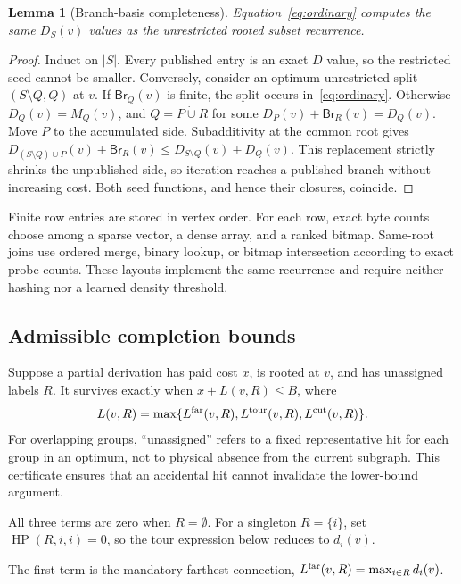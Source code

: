 \documentclass[sigconf,nonacm]{acmart}
\newtheorem{lemma}{Lemma}
\newcommand{\Br}{\mathsf{Br}}
\begin{document}
\begin{lemma}[Branch-basis completeness]
\label{lem:branch}
Equation~\eqref{eq:ordinary} computes the same $D_S(v)$ values as the unrestricted rooted subset recurrence.
\end{lemma}
\begin{proof}
Induct on $|S|$.  Every published entry is an exact $D$ value, so the restricted seed cannot be smaller.  Conversely, consider an optimum unrestricted split $(S\setminus Q,Q)$ at $v$.  If $\Br_Q(v)$ is finite, the split occurs in~\eqref{eq:ordinary}.  Otherwise $D_Q(v)=M_Q(v)$, and $Q=P\mathbin{\dot\cup}R$ for some $D_P(v)+\Br_R(v)=D_Q(v)$.  Move $P$ to the accumulated side.  Subadditivity at the common root gives
$D_{(S\setminus Q)\cup P}(v)+\Br_R(v)\leq D_{S\setminus Q}(v)+D_Q(v)$.
This replacement strictly shrinks the unpublished side, so iteration reaches a published branch without increasing cost.  Both seed functions, and hence their closures, coincide.
\end{proof}

Finite row entries are stored in vertex order.  For each row, exact byte counts choose among a sparse vector, a dense array, and a ranked bitmap.  Same-root joins use ordered merge, binary lookup, or bitmap intersection according to exact probe counts.  These layouts implement the same recurrence and require neither hashing nor a learned density threshold.

\subsection{Admissible completion bounds}
\label{sec:lower}

Suppose a partial derivation has paid cost $x$, is rooted at $v$, and has unassigned labels $R$.  It survives exactly when $x+L(v,R)\leq B$, where
\begin{equation}
 L(v,R)=\max\{L^{\rm far}(v,R),L^{\rm tour}(v,R),L^{\rm cut}(v,R)\}.
 \label{eq:lower}
\end{equation}
For overlapping groups, ``unassigned'' refers to a fixed representative hit for each group in an optimum, not to physical absence from the current subgraph.  This certificate ensures that an accidental hit cannot invalidate the lower-bound argument.

All three terms are zero when $R=\emptyset$.  For a singleton $R=\{i\}$, set $\operatorname{HP}(R,i,i)=0$, so the tour expression below reduces to $d_i(v)$.

The first term is the mandatory farthest connection,
$L^{\rm far}(v,R)=\max_{i\in R}d_i(v)$.
\end{document}
